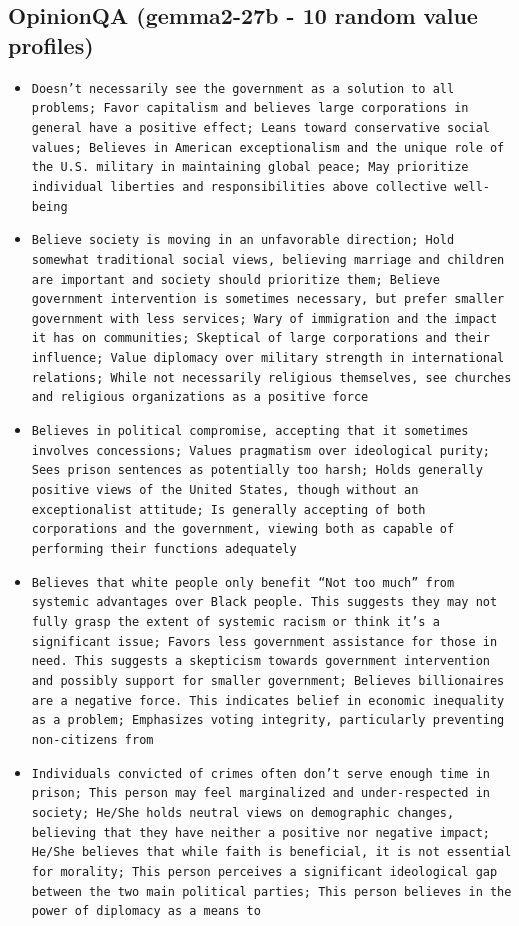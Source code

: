 \documentclass[11pt]{article}
\begin{document}
\subsection{OpinionQA (gemma2-27b - 10 random value profiles)}
\begin{itemize}
\item \texttt{Doesn't necessarily see the government as a solution to all problems; Favor capitalism and believes large corporations in general have a positive effect; Leans toward conservative social values; Believes in American exceptionalism and the unique role of the U.S. military in maintaining global peace; May prioritize individual liberties and responsibilities above collective well-being}
\item \texttt{Believe society is moving in an unfavorable direction; Hold somewhat traditional social views, believing marriage and children are important and society should prioritize them; Believe government intervention is sometimes necessary, but prefer smaller government with less services; Wary of immigration and the impact it has on communities; Skeptical of large corporations and their influence; Value diplomacy over military strength in international relations; While not necessarily religious themselves, see churches and religious organizations as a positive force}
\item \texttt{Believes in political compromise, accepting that it sometimes involves concessions; Values pragmatism over ideological purity; Sees prison sentences as potentially too harsh; Holds generally positive views of the United States, though without an exceptionalist attitude; Is generally accepting of both corporations and the government, viewing both as capable of performing their functions adequately}
\item \texttt{Believes that white people only benefit “Not too much” from systemic advantages over Black people. This suggests they may not fully grasp the extent of systemic racism or think it’s a significant issue; Favors less government assistance for those in need. This suggests a skepticism towards government intervention and possibly support for smaller government; Believes billionaires are a negative force.  This indicates belief in economic inequality as a problem; Emphasizes voting integrity, particularly preventing non-citizens from}
\item \texttt{Individuals convicted of crimes often don't serve enough time in prison; This person may feel marginalized and under-respected in society; He/She holds neutral views on demographic changes, believing that they have neither a positive nor negative impact; He/She believes that while faith is beneficial, it is not essential for morality; This person perceives a significant ideological gap between the two main political parties; This person believes in the power of diplomacy as a means to}

\end{itemize}
\end{document}
